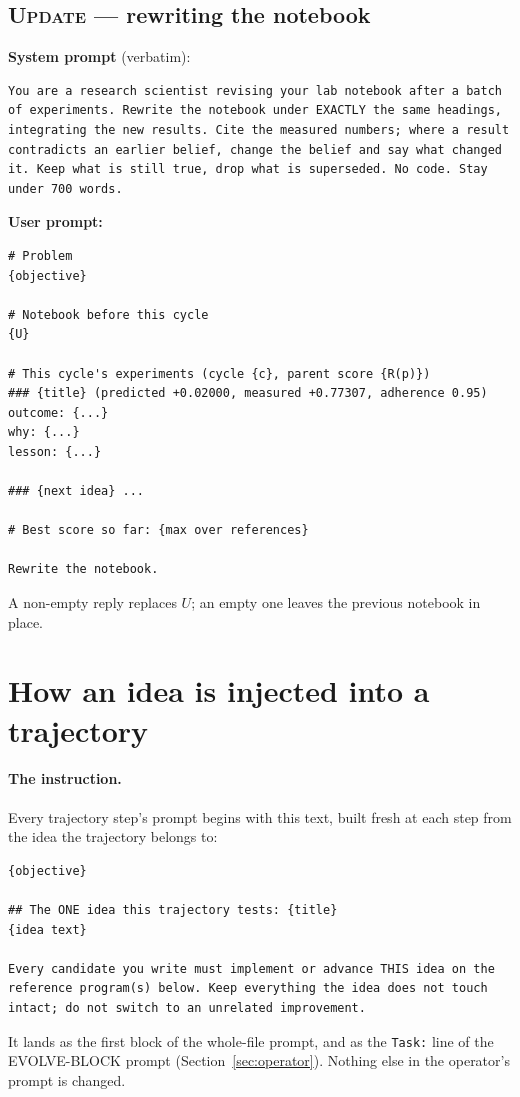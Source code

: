 \documentclass[11pt]{article}
\newcommand{\call}[1]{\textsc{#1}}
\begin{document}
\subsection{\call{Update} --- rewriting the notebook}

\noindent\textbf{System prompt} (verbatim):
\begin{lstlisting}
You are a research scientist revising your lab notebook after a batch of experiments. Rewrite the notebook under EXACTLY the same headings, integrating the new results. Cite the measured numbers; where a result contradicts an earlier belief, change the belief and say what changed it. Keep what is still true, drop what is superseded. No code. Stay under 700 words.
\end{lstlisting}

\noindent\textbf{User prompt:}
\begin{lstlisting}
# Problem
{objective}

# Notebook before this cycle
{U}

# This cycle's experiments (cycle {c}, parent score {R(p)})
### {title} (predicted +0.02000, measured +0.77307, adherence 0.95)
outcome: {...}
why: {...}
lesson: {...}

### {next idea} ...

# Best score so far: {max over references}

Rewrite the notebook.
\end{lstlisting}
A non-empty reply replaces $U$; an empty one leaves the previous notebook in place.

\section{How an idea is injected into a trajectory}
\label{sec:inject}

\paragraph{The instruction.} Every trajectory step's prompt begins with this text, built fresh
at each step from the idea the trajectory belongs to:
\begin{lstlisting}
{objective}

## The ONE idea this trajectory tests: {title}
{idea text}

Every candidate you write must implement or advance THIS idea on the reference program(s) below. Keep everything the idea does not touch intact; do not switch to an unrelated improvement.
\end{lstlisting}
It lands as the first block of the whole-file prompt, and as the \texttt{Task:} line of the
EVOLVE-BLOCK prompt (Section~\ref{sec:operator}). Nothing else in the operator's prompt is
changed.
\end{document}
